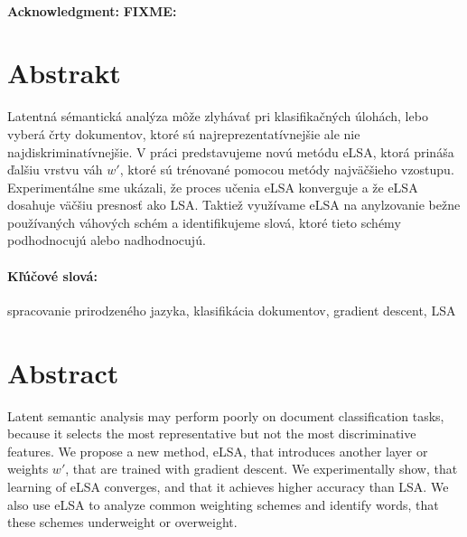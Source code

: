 \documentclass[12pt, oneside]{book}
\theoremstyle{definition}
\def\*{{\color{red} \bf FIXME: }}
\begin{document}
\newpage 
\thispagestyle{empty}



\frontmatter

\setcounter{page}{3}
\newpage 
~

\vfill
{\bf Acknowledgment:} \*




\newpage 
\section*{Abstrakt}

Latentná sémantická analýza môže zlyhávať pri klasifikačných úlohách, lebo vyberá črty dokumentov, ktoré sú najreprezentatívnejšie ale nie najdiskriminatívnejšie. 
V práci predstavujeme novú metódu eLSA, ktorá prináša ďalšiu vrstvu váh $w'$, ktoré sú trénované pomocou metódy najväčšieho vzostupu.
Experimentálne sme ukázali, že proces učenia eLSA konverguje a že eLSA dosahuje väčšiu presnosť ako LSA.
Taktiež využívame eLSA na anylzovanie bežne používaných váhových schém a identifikujeme slová, ktoré tieto schémy podhodnocujú alebo nadhodnocujú.

\paragraph*{Kľúčové slová:} spracovanie prirodzeného jazyka, klasifikácia dokumentov, gradient descent, LSA


\newpage 
\section*{Abstract}

Latent semantic analysis may perform poorly on document classification tasks, because it selects the most representative but not the most discriminative features.
We propose a new method, eLSA, that introduces another layer or weights $w'$, that are trained with gradient descent.
We experimentally show, that learning of eLSA converges, and that it achieves higher accuracy than LSA. 
We also use eLSA to analyze common weighting schemes and identify words, that these schemes underweight or overweight.
\end{document}
